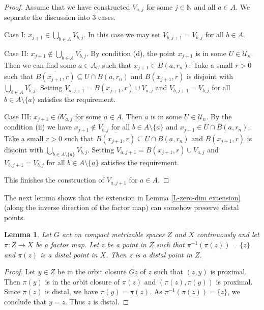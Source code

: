 \documentclass[11pt]{amsart}
\newtheorem{lemma}[theorem]{Lemma}
\theoremstyle{definition}
\numberwithin{equation}{section}
\theoremstyle{definition}
\newcommand{\cU}{{\mathcal U}}
\newcommand{\Nb}{{\mathbb N}}
\begin{document}
\begin{proof}
Assume that we have constructed $V_{a, j}$ for some $j\in \Nb$ and all $a\in A$. 
We separate the discussion into 3 cases. 

Case I: $x_{j+1}\in \bigcup_{b\in A} V_{b, j}$. In this case we may set $V_{b, j+1}=V_{b, j}$ for all $b\in A$. 

Case II: $x_{j+1}\not\in \bigcup_{b\in A} \overline{V_{b, j}}$. By condition (d), the point $x_{j+1}$ is in some $U\in \cU_n$. Then we can find some $a\in A_U$ such that $x_{j+1}\in B(a, r_n)$. Take a small $r>0$ such that  $\overline{B(x_{j+1}, r)}\subseteq U\cap B(a, r_n)$ and 
$\overline{B(x_{j+1}, r)}$ is disjoint with $\bigcup_{b\in A} \overline{V_{b, j}}$. Setting $V_{a, j+1}=B(x_{j+1}, r)\cup V_{a, j}$ and $V_{b, j+1}=V_{b, j}$ for all $b\in A\setminus \{a\}$ satisfies the requirement. 

Case III: $x_{j+1}\in \partial V_{a, j}$ for some $a\in A$. Then $a$ is in some $U\in \cU_n$. By the condition (ii) we have $x_{j+1}\not\in \overline{V_{b, j}}$ for all $b\in A\setminus \{a\}$ and $x_{j+1}\in U\cap B(a, r_n)$. Take a small $r>0$ such that  $\overline{B(x_{j+1}, r)}\subseteq U\cap B(a, r_n)$ and 
$\overline{B(x_{j+1}, r)}$ is disjoint with $\bigcup_{b\in A\setminus \{a\}} \overline{V_{b, j}}$. Setting $V_{a, j+1}=B(x_{j+1}, r)\cup V_{a, j}$ and $V_{b, j+1}=V_{b, j}$ for all $b\in A\setminus \{a\}$ satisfies the requirement. 

This finishes the construction of $V_{a, j+1}$ for $a\in A$.
\end{proof}

The next lemma shows that the extension in Lemma \ref{L-zero-dim extension} (along the inverse direction of the factor map) can somehow preserve distal points.

\begin{lemma} \label{L-one-one to point-distal}
Let $G$ act on compact metrizable spaces $Z$ and $X$ continuously and let $\pi: Z\rightarrow X$ be a factor map. 
Let $z$ be a point in $Z$ such that $\pi^{-1}(\pi(z))=\{z\}$ and $\pi(z)$ is a distal point in $X$.  Then $z$ is a distal point in $Z$. 
\end{lemma}
\begin{proof} Let $y\in Z$ be in the orbit closure $\overline{Gz}$ of $z$ such that $(z, y)$ is proximal. Then $\pi(y)$ is in the orbit closure of $\pi(z)$ and $(\pi(z), \pi(y))$ is proximal. Since $\pi(z)$ is distal, we have $\pi(y)=\pi(z)$. As $\pi^{-1}(\pi(z))=\{z\}$, we conclude that $y=z$. Thus $z$ is distal.
\end{proof}
\end{document}

